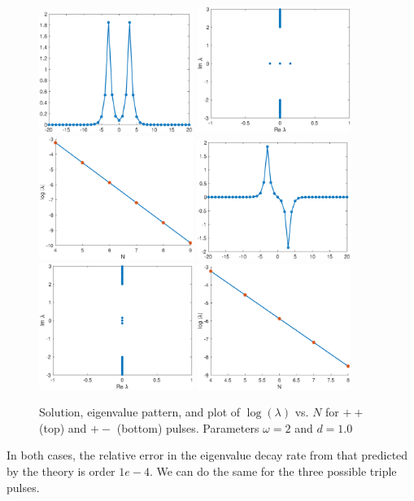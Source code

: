 \documentclass[12pt]{article}
\begin{document}
\begin{figure}[H]
\centering
\includegraphics[width=5cm]{dnlsPP.eps}
\includegraphics[width=5cm]{dnlsPPeig.eps}
\includegraphics[width=5cm]{dnlsPPdecay.eps}
\includegraphics[width=5cm]{dnlsPM.eps}
\includegraphics[width=5cm]{dnlsPMeig.eps}
\includegraphics[width=5cm]{dnlsPMdecay.eps}
\label{fig:eigendecay1}
\caption{Solution, eigenvalue pattern, and plot of $\log(\lambda)$ vs. $N$ for $++$ (top) and $+-$ (bottom) pulses. Parameters $\omega = 2$ and $d = 1.0$}
\end{figure}
In both cases, the relative error in the eigenvalue decay rate from that predicted by the theory is order $1e-4$. We can do the same for the three possible triple pulses.
\end{document}
